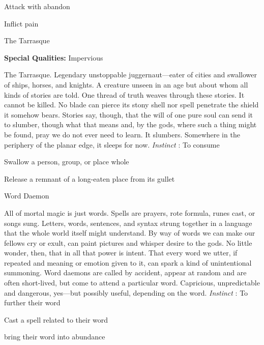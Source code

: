 \startitemize[1,packed]

\item Attack with abandon

 
\item Inflict pain


\stopitemize
 
\startMonsterName
The Tarrasque	 
\stopMonsterName
 
\startMonsterQualities
{\bf Special Qualities:}  Impervious
\stopMonsterQualities
 
\startMonsterDescription
The Tarrasque. Legendary unstoppable juggernaut—eater of cities and swallower of ships, horses, and knights. A creature unseen in an age but about whom all kinds of stories are told. One thread of truth weaves through these stories. It cannot be killed. No blade can pierce its stony shell nor spell penetrate the shield it somehow bears. Stories say, though, that the will of one pure soul can send it to slumber, though what that means and, by the gods, where such a thing might be found, pray we do not ever need to learn. It slumbers. Somewhere in the periphery of the planar edge, it sleeps for now. {\em Instinct} : To consume
\stopMonsterDescription
 
\startitemize[1,packed]

\item Swallow a person, group, or place whole

 
\item Release a remnant of a long-eaten place from its gullet


\stopitemize
 
\startMonsterName
Word Daemon	 
\stopMonsterName
 
\startMonsterDescription
All of mortal magic is just words. Spells are prayers, rote formula, runes cast, or songs sung. Letters, words, sentences, and syntax strung together in a language that the whole world itself might understand. By way of words we can make our fellows cry or exult, can paint pictures and whisper desire to the gods. No little wonder, then, that in all that power is intent. That every word we utter, if repeated and meaning or emotion given to it, can spark a kind of unintentional summoning. Word daemons are called by accident, appear at random and are often short-lived, but come to attend a particular word. Capricious, unpredictable and dangerous, yes—but possibly useful, depending on the word. {\em Instinct} : To further their word
\stopMonsterDescription
 
\startitemize[1,packed]

\item Cast a spell related to their word

 
\item bring their word into abundance


\stopitemize
 






